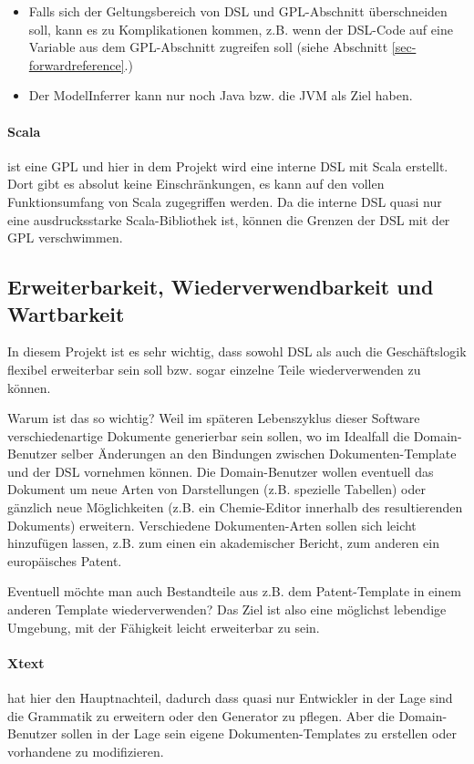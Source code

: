 \begin{itemize}
  \item Falls sich der Geltungsbereich von DSL und GPL-Abschnitt überschneiden
        soll, kann es zu Komplikationen kommen, z.B. wenn der DSL-Code
        auf eine Variable aus dem GPL-Abschnitt zugreifen soll (siehe
        Abschnitt \ref{sec-forwardreference}.)
  \item Der ModelInferrer kann nur noch Java bzw. die JVM als Ziel haben.
\end{itemize}

\paragraph{Scala} ist eine GPL und hier in dem Projekt wird eine interne
DSL mit Scala erstellt. Dort gibt es absolut keine Einschränkungen, es
kann auf den vollen Funktionsumfang von Scala zugegriffen werden.
Da die interne DSL quasi nur eine ausdrucksstarke Scala-Bibliothek ist,
können die Grenzen der DSL mit der GPL verschwimmen.


\subsection{Erweiterbarkeit, Wiederverwendbarkeit und Wartbarkeit}
\label{sec-erweiterbar}

In diesem Projekt ist es sehr wichtig, dass sowohl DSL als auch
die Geschäftslogik flexibel erweiterbar sein soll bzw. sogar
einzelne Teile wiederverwenden zu können.

Warum ist das so wichtig? Weil im späteren Lebenszyklus dieser Software
verschiedenartige Dokumente generierbar sein sollen, wo im Idealfall
die Domain-Benutzer selber Änderungen an den Bindungen zwischen
Dokumenten-Template und der DSL vornehmen können. Die Domain-Benutzer
wollen eventuell das Dokument um neue Arten von Darstellungen (z.B. spezielle
Tabellen) oder gänzlich neue Möglichkeiten (z.B. ein Chemie-Editor
innerhalb des resultierenden Dokuments) erweitern.
Verschiedene Dokumenten-Arten sollen sich leicht hinzufügen lassen,
z.B. zum einen ein akademischer Bericht, zum anderen ein europäisches Patent.

Eventuell möchte man auch Bestandteile aus z.B. dem Patent-Template in
einem anderen Template wiederverwenden? Das Ziel ist also eine
möglichst lebendige Umgebung, mit der Fähigkeit leicht erweiterbar zu sein.

\paragraph{Xtext} hat hier den Hauptnachteil, dadurch dass quasi nur
Entwickler in der Lage sind die Grammatik zu erweitern oder den
Generator zu pflegen. Aber die Domain-Benutzer sollen in der Lage sein
eigene Dokumenten-Templates zu erstellen oder vorhandene zu modifizieren.

